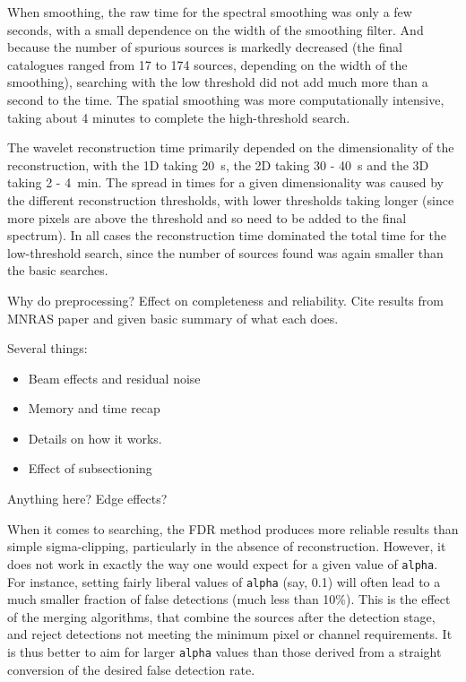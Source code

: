 When smoothing, the raw time for the spectral smoothing was only a few
seconds, with a small dependence on the width of the smoothing
filter. And because the number of spurious sources is markedly
decreased (the final catalogues ranged from 17 to 174 sources,
depending on the width of the smoothing), searching with the low
threshold did not add much more than a second to the time. The spatial
smoothing was more computationally intensive, taking about 4 minutes
to complete the high-threshold search.

The wavelet reconstruction time primarily depended on the
dimensionality of the reconstruction, with the 1D taking 20~s, the 2D
taking 30 - 40~s and the 3D taking 2 - 4~min. The spread in times for
a given dimensionality was caused by the different reconstruction
thresholds, with lower thresholds taking longer (since more pixels are
above the threshold and so need to be added to the final spectrum). In
all cases the reconstruction time dominated the total time for the
low-threshold search, since the number of sources found was again
smaller than the basic searches.



Why do preprocessing? Effect on completeness and reliability. Cite
results from MNRAS paper and given basic summary of what each does.


Several things:
\begin{itemize}
\item Beam effects and residual noise
\item Memory and time recap
\item Details on how it works. 
\item Effect of subsectioning
\end{itemize}


Anything here? Edge effects?


When it comes to searching, the FDR method produces more reliable
results than simple sigma-clipping, particularly in the absence of
reconstruction.  However, it does not work in exactly the way one
would expect for a given value of \texttt{alpha}. For instance,
setting fairly liberal values of \texttt{alpha} (say, 0.1) will often
lead to a much smaller fraction of false detections (\ie much less
than 10\%). This is the effect of the merging algorithms, that combine
the sources after the detection stage, and reject detections not
meeting the minimum pixel or channel requirements.  It is thus better
to aim for larger \texttt{alpha} values than those derived from a
straight conversion of the desired false detection rate.

